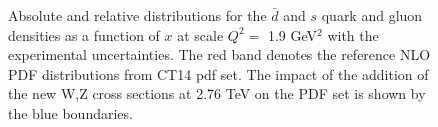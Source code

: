 \begin{figure}[!tbp]
\begin{minipage}[h]{0.4\linewidth}
\end{minipage}
\hfill
\begin{minipage}[h]{0.4\linewidth}
\end{minipage}
\vfill
\begin{minipage}[h]{0.4\linewidth}
\end{minipage}
\hfill
\begin{minipage}[h]{0.4\linewidth}
\end{minipage}
\vfill
\begin{minipage}[h]{0.4\linewidth}
\end{minipage}
\hfill
\begin{minipage}[h]{0.4\linewidth}
\end{minipage}
\caption{Absolute and  relative distributions for the $\bar{d}$ and $s$ quark and gluon densities as a function of $x$ at scale $Q^2=$ 1.9 GeV$^2$ with the experimental uncertainties. The red band denotes the reference NLO PDF distributions from CT14 pdf set. The impact of the addition of the new W,Z cross sections at 2.76 TeV on the PDF set is shown by the blue boundaries.}
\label{fig:PDFSeaShift}
\end{figure}



